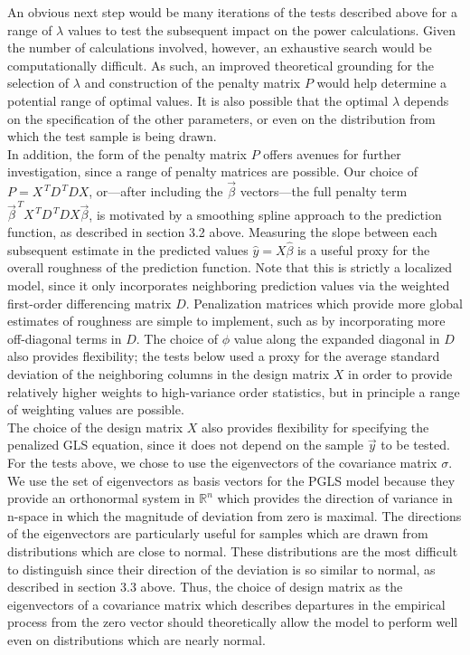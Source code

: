 \documentclass[12pt]{article}
\begin{document}
An obvious next step would be many iterations of the tests described above for a range of $\lambda$ values to test the subsequent impact on the power calculations. Given the number of calculations involved, however, an exhaustive search would be computationally difficult. As such, an improved theoretical grounding for the selection of $\lambda$ and construction of the penalty matrix $P$ would help determine a potential range of optimal values. It is also possible that the optimal $\lambda$ depends on the specification of the other parameters, or even on the distribution from which the test sample is being drawn.\\

In addition, the form of the penalty matrix $P$ offers avenues for further investigation, since a range of penalty matrices are possible. Our choice of $P=X^{\, T}D^{\, T}DX$, or---after including the $\vec{\beta}$ vectors---the full penalty term $\vec{\beta}^{\, T}X^{\, T}D^{\, T}DX\vec{\beta}$, is motivated by a smoothing spline approach to the prediction function, as described in section 3.2 above. Measuring the slope between each subsequent estimate in the predicted values $\hat{y}=X\hat{\beta}$ is a useful proxy for the overall roughness of the prediction function. Note that this is strictly a localized model, since it only incorporates neighboring prediction values via the weighted first-order differencing matrix $D$. Penalization matrices which provide more global estimates of roughness are simple to implement, such as by incorporating more off-diagonal terms in $D$. The choice of $\phi$ value along the expanded diagonal in $D$ also provides flexibility; the tests below used a proxy for the average standard deviation of the neighboring columns in the design matrix $X$ in order to provide relatively higher weights to high-variance order statistics, but in principle a range of weighting values are possible.\\

The choice of the design matrix $X$ also provides flexibility for specifying the penalized GLS equation, since it does not depend on the sample $\vec{y}$ to be tested. For the tests above, we chose to use the eigenvectors of the covariance matrix $\sigma$. We use the set of eigenvectors as basis vectors for the PGLS model because they provide an orthonormal system in $\mathbb{R}^n$ which provides the direction of variance in n-space in which the magnitude of deviation from zero is maximal. The directions of the eigenvectors are particularly useful for samples which are drawn from distributions which are close to normal. These distributions are the most difficult to distinguish since their direction of the deviation is so similar to normal, as described in section 3.3 above. Thus, the choice of design matrix as the eigenvectors of a covariance matrix which describes departures in the empirical process from the zero vector should theoretically allow the model to perform well even on distributions which are nearly normal. \\
\end{document}
